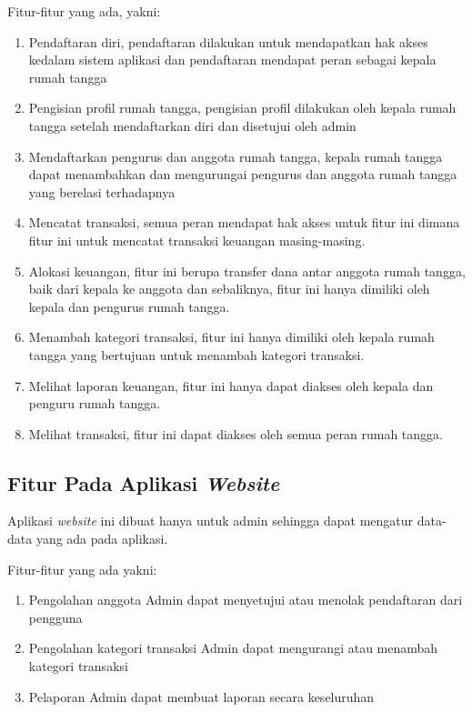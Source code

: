 Fitur-fitur yang ada, yakni:
\begin{enumerate}
	\item Pendaftaran diri, pendaftaran dilakukan untuk mendapatkan hak akses kedalam sistem aplikasi dan pendaftaran mendapat peran sebagai kepala rumah tangga
	\item Pengisian profil rumah tangga, pengisian profil dilakukan oleh kepala rumah tangga setelah mendaftarkan diri dan disetujui oleh admin
	\item	Mendaftarkan pengurus dan anggota rumah tangga, kepala rumah tangga dapat menambahkan dan mengurungai pengurus dan anggota rumah tangga yang berelasi terhadapnya
	\item Mencatat transaksi, semua peran mendapat hak akses untuk fitur ini dimana fitur ini untuk mencatat transaksi keuangan masing-masing.
	\item Alokasi keuangan, fitur ini berupa transfer dana antar anggota rumah tangga, baik dari kepala ke anggota dan sebaliknya, fitur ini hanya dimiliki oleh kepala dan pengurus rumah tangga.
	\item Menambah kategori transaksi, fitur ini hanya dimiliki oleh kepala rumah tangga yang bertujuan untuk menambah kategori transaksi.
	\item Melihat laporan keuangan, fitur ini hanya dapat diakses oleh kepala dan penguru rumah tangga.
	\item Melihat transaksi, fitur ini dapat diakses oleh semua peran rumah tangga.
\end{enumerate}

\subsection{Fitur Pada Aplikasi \textit{Website}}

\hspace{0,5cm}Aplikasi \textit{website} ini dibuat hanya untuk admin sehingga dapat mengatur data-data yang ada pada aplikasi.

Fitur-fitur yang ada yakni:
\begin{enumerate}
	\item Pengolahan anggota
				Admin dapat menyetujui atau menolak pendaftaran dari pengguna
	\item	Pengolahan kategori transaksi
				Admin dapat mengurangi atau menambah kategori transaksi
	\item Pelaporan
				Admin dapat membuat laporan secara keseluruhan
\end{enumerate}

